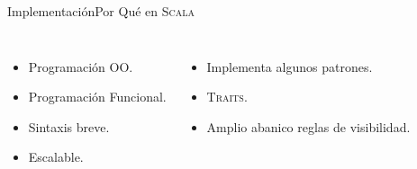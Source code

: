 \documentclass{beamer}
\begin{document}
\begin{frame}{Implementación}{Por Qué en \textsc{Scala}}
  \begin{columns}[onlytextwidth,c]
    \begin{itemize}
    \item Programación OO.
    \item Programación Funcional.
    \item Sintaxis breve.
    \item Escalable.
    \end{itemize}
    \begin{itemize}
    \item Implementa algunos patrones.
    \item \textsc{Traits}.
    \item Amplio abanico reglas de visibilidad.
    \end{itemize}
  \end{columns}
\end{frame}
\end{document}
